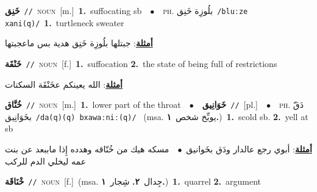\documentclass[10pt,a4paper,twoside]{article} %
\begin{document}
\begin{multicols}{2}
{\setlength\topsep{0pt}\textbf{\foreignlanguage{arabic}{خَنِق}}\ {\color{gray}\texttt{//}\color{black}}\ \textsc{noun}\ [m.]\ \textbf{1.}~suffocating sb\ \ $\bullet$\ \ \textsc{ph.} \color{gray} \foreignlanguage{arabic}{بلُوزِة خَنِق}\color{black}\ {\color{gray}\texttt{/{\sffamily bluːze xani(q)}/}\color{black}}\ \textbf{1.}~turtleneck sweater\  \begin{flushright}\color{gray}\foreignlanguage{arabic}{\textbf{\underline{\foreignlanguage{arabic}{أمثلة}}}: جبتلها بلُوزِة خَنِق هدية بس ماعجبتها}\end{flushright}\color{black}} \vspace{2mm}

{\setlength\topsep{0pt}\textbf{\foreignlanguage{arabic}{خَنْقَة}}\ {\color{gray}\texttt{//}\color{black}}\ \textsc{noun}\ [f.]\ \textbf{1.}~suffocation  \textbf{2.}~the state of being full of restrictions\  \begin{flushright}\color{gray}\foreignlanguage{arabic}{\textbf{\underline{\foreignlanguage{arabic}{أمثلة}}}: الله يعينكم عخَنْقَة السكنات}\end{flushright}\color{black}} \vspace{2mm}

{\setlength\topsep{0pt}\textbf{\foreignlanguage{arabic}{خُنَّاق}}\ {\color{gray}\texttt{//}\color{black}}\ \textsc{noun}\ [m.]\ \textbf{1.}~lower part of the throat\ \ $\bullet$\ \ \setlength\topsep{0pt}\textbf{\foreignlanguage{arabic}{خَوَانِيق}}\ {\color{gray}\texttt{//}\color{black}}\ [pl.]\ \ $\bullet$\ \ \textsc{ph.} \color{gray} \foreignlanguage{arabic}{دَقّ بخَوَانِيق}\color{black}\ {\color{gray}\texttt{/{\sffamily da(q)(q) bxawaːniː(q)}/}\color{black}}\ \color{gray} (msa. \foreignlanguage{arabic}{يوبِّخ شخص}~\foreignlanguage{arabic}{\textbf{١.}})\color{black}\ \textbf{1.}~scold sb.  \textbf{2.}~yell at sb\  \begin{flushright}\color{gray}\foreignlanguage{arabic}{\textbf{\underline{\foreignlanguage{arabic}{أمثلة}}}: أبوي رجع عالدار ودَق بخَوانيق\ $\bullet$\ \  مسكه هيك من خُنّاقه وهدده إِذا ماببعد عن بنت عمه ليخلي الدم للركب}\end{flushright}\color{black}} \vspace{2mm}

{\setlength\topsep{0pt}\textbf{\foreignlanguage{arabic}{خْنَاقَة}}\ {\color{gray}\texttt{//}\color{black}}\ \textsc{noun}\ [f.]\ \color{gray}(msa. \foreignlanguage{arabic}{جِدال}~\foreignlanguage{arabic}{\textbf{٢.}}  \foreignlanguage{arabic}{شِجار}~\foreignlanguage{arabic}{\textbf{١.}})\color{black}\ \textbf{1.}~quarrel  \textbf{2.}~argument\ } \vspace{2mm}


\end{multicols}
\end{document}
